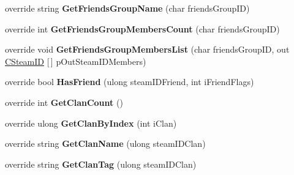 \begin{DoxyCompactItemize}
\item 
\mbox{\label{class_valve_1_1_steamworks_1_1_c_steam_friends_a882fe47c61158dac648b7990c6d7bd2c}} 
override string {\bfseries Get\+Friends\+Group\+Name} (char friends\+Group\+ID)
\item 
\mbox{\label{class_valve_1_1_steamworks_1_1_c_steam_friends_a89107fd92279724e5dbc21c22f47bf13}} 
override int {\bfseries Get\+Friends\+Group\+Members\+Count} (char friends\+Group\+ID)
\item 
\mbox{\label{class_valve_1_1_steamworks_1_1_c_steam_friends_a582e71144133617a514c216260054e11}} 
override void {\bfseries Get\+Friends\+Group\+Members\+List} (char friends\+Group\+ID, out \hyperlink{struct_valve_1_1_steamworks_1_1_c_steam_i_d}{C\+Steam\+ID} \mbox{[}$\,$\mbox{]} p\+Out\+Steam\+I\+D\+Members)
\item 
\mbox{\label{class_valve_1_1_steamworks_1_1_c_steam_friends_a91c78e94486793d55614405ebaee4043}} 
override bool {\bfseries Has\+Friend} (ulong steam\+I\+D\+Friend, int i\+Friend\+Flags)
\item 
\mbox{\label{class_valve_1_1_steamworks_1_1_c_steam_friends_ac3d89a1efc02b1e1c69200fa326a2b5b}} 
override int {\bfseries Get\+Clan\+Count} ()
\item 
\mbox{\label{class_valve_1_1_steamworks_1_1_c_steam_friends_a9eebe5026ef528b1f9a71fbae09fe6ec}} 
override ulong {\bfseries Get\+Clan\+By\+Index} (int i\+Clan)
\item 
\mbox{\label{class_valve_1_1_steamworks_1_1_c_steam_friends_af758d6faa0869109f984a83338ee3445}} 
override string {\bfseries Get\+Clan\+Name} (ulong steam\+I\+D\+Clan)
\item 
\mbox{\label{class_valve_1_1_steamworks_1_1_c_steam_friends_a87009f1b60c9bb1f79caed0a08aed1ea}} 
override string {\bfseries Get\+Clan\+Tag} (ulong steam\+I\+D\+Clan)

\end{DoxyCompactItemize}

